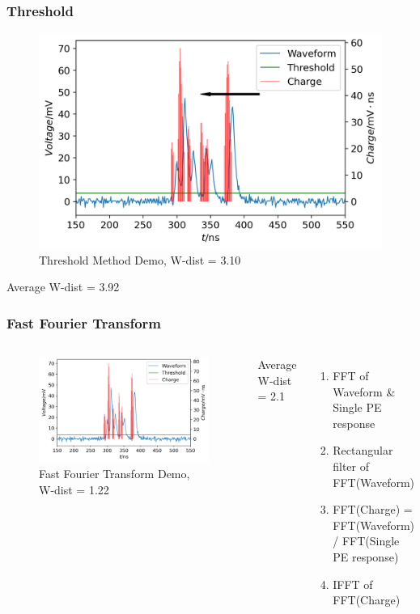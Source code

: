 \documentclass[handout]{beamer}
\begin{document}
\begin{frame}
\frametitle{Threshold}
\begin{figure}
    \centering
    \caption{Threshold Method Demo, W-dist = 3.10}
    \includegraphics[width=0.9\linewidth]{img/threshold.png}
\end{figure}
\vspace{-4mm}
\begin{center}
    Average W-dist = 3.92
\end{center}
\end{frame}

\begin{frame}
\frametitle{Fast Fourier Transform}
\begin{columns}
\begin{figure}
    \centering
    \caption{Fast Fourier Transform Demo, W-dist = 1.22}
    \includegraphics[width=1.0\linewidth]{img/fftrans.png}
\end{figure}
\vspace{-4mm}
\begin{center}
    Average W-dist = 2.1
\end{center}
\begin{enumerate}
    \item FFT of Waveform \& Single PE response
    \item Rectangular filter of FFT(Waveform)
    \item FFT(Charge) = FFT(Waveform) / FFT(Single PE response)
    \item IFFT of FFT(Charge)
\end{enumerate}
\end{columns}
\end{frame}
\end{document}
